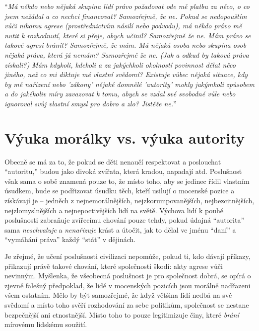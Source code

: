 \documentclass{book}
\begin{document}
\enquote{\emph{Má někdo nebo nějaká skupina lidí právo požadovat ode mě platbu za něco, o co jsem nežádal a co nechci financovat? Samozřejmě, že ne. Pokud se nedopouštím vůči nikomu agrese (prostřednictvím násilí nebo podvodu), má někdo právo mě nutit k rozhodnutí, které si přeje, abych učinil? Samozřejmě že ne. Mám právo se takové agresi bránit? Samozřejmě, že mám. Má nějaká osoba nebo skupina osob nějaká práva, která já nemám? Samozřejmě že ne. (Jak a odkud by taková práva získali?) Mám kdykoli, kdekoli a za jakýchkoli okolností povinnost dělat něco jiného, než co mi diktuje mé vlastní svědomí? Existuje vůbec nějaká situace, kdy by mě nařízení nebo 'zákony' nějaké domnělé 'autority' mohly jakýmkoli způsobem a do jakékoliv míry zavazovat k tomu, abych se vzdal své svobodné vůle nebo ignoroval svůj vlastní smysl pro dobro a zlo? Jistěže ne.}}

\section{Výuka morálky vs. výuka autority}

Obecně se má za to, že pokud se děti nenaučí respektovat a poslouchat \enquote{autoritu,} budou jako divoká zvířata, která kradou, napadají atd. Poslušnost však sama o sobě znamená pouze to, že místo toho, aby se jedinec řídil vlastním úsudkem, bude se podřizovat úsudku těch, kteří usilují o mocenské pozice a získávají je -- jedněch z nejnemorálnějších, nejzkorumpovanějších, nejbezcitnějších, nejzlomyslnějších a nejnepoctivějších lidí na světě. Výchova lidí k pouhé poslušnosti zabraňuje zvířecímu chování pouze tehdy, pokud údajná \enquote{autorita} sama \emph{neschvaluje} a \emph{nenařizuje} krást a útočit, jak to dělal ve jménu \enquote{daní} a \enquote{vymáhání práva} každý \enquote{stát} v dějinách.

Je zřejmé, že učení poslušnosti civilizaci nepomůže, pokud ti, kdo dávají příkazy, přikazují právě takové chování, které společnosti škodí: akty agrese vůči nevinným. Myšlenka, že všeobecná poslušnost je pro společnost dobrá, se opírá o zjevně falešný předpoklad, že lidé v mocenských pozicích jsou morálně nadřazeni všem ostatním. Mělo by být samozřejmé, že když většina lidí nedbá na své svědomí a místo toho svěří rozhodování za sebe politikům, společnost se nestane bezpečnější ani ctnostnější. Místo toho to pouze legitimizuje činy, které \emph{brání} mírovému lidskému soužití.
\end{document}
